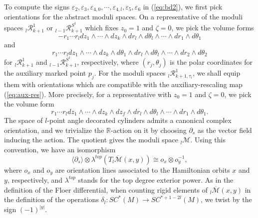 \documentclass[a4paper]{article}
\numberwithin{equation}{section}
\begin{document}
To compute the signs $\varepsilon_2,\varepsilon_3,\varepsilon_{4,0},\cdots,\varepsilon_{4,l},\varepsilon_5,\varepsilon_6$ in (\ref{eq:bd2}), we first pick orientations for the abstract moduli spaces. On a representative of the moduli spaces ${}_l\mathcal{R}_{k+1}^1$ or ${}_{l-1}\mathcal{R}_{k+1}^{S^1}$ which fixes $z_0=1$ and $\zeta=0$, we pick the volume forms
\begin{equation}
-r_1\cdots r_ldz_1\wedge\cdots\wedge dz_k\wedge dr_l\wedge d\theta_l\wedge\cdots\wedge dr_1\wedge d\theta_1
\end{equation}
and
\begin{equation}
r_1\cdots r_ldz_1\wedge\cdots\wedge dz_k\wedge d\theta_1\wedge dr_l\wedge d\theta_l\wedge\cdots\wedge dr_2\wedge d\theta_2
\end{equation}
for ${}_l\mathcal{R}_{k+1}^1$ and ${}_{l-1}\mathcal{R}_{k+1}^{S^1}$, respectively, where $(r_j,\theta_j)$ is the polar coordinates for the auxiliary marked point $p_j$. For the moduli spaces ${}_l\mathcal{R}_{k+1,\tau_i}^1$, we shall equip them with orientations which are compatible with the auxiliary-rescaling map (\ref{eq:aux-res}). More precisely, for a representative with $z_0=1$ and $\zeta=0$, we pick the volume form
\begin{equation}
r_1\cdots r_ldz_1\wedge\cdots\wedge dz_k\wedge dz_f\wedge dr_l\wedge d\theta_l\wedge\cdots\wedge dr_1\wedge d\theta_1.
\end{equation}
The space of $l$-point angle decorated cylinders admits a canonical complex orientation, and we trivialize the $\mathbb{R}$-action on it by choosing $\partial_s$ as the vector field inducing the action. The quotient gives the moduli space ${}_l\mathcal{M}$. Using this convention, we have an isomorphism
\begin{equation}\label{eq:M}
\langle\partial_s\rangle\otimes\lambda^\mathit{top}\left(T{}_l\overline{\mathcal{M}}(x,y)\right)\cong o_x\otimes o_y^{-1},
\end{equation}
where $o_x$ and $o_y$ are orientation lines associated to the Hamiltonian orbits $x$ and $y$, respectively, and $\lambda^\mathit{top}$ stands for the top degree exterior power. As in the definition of the Floer differential, when counting rigid elements of ${}_l\overline{\mathcal{M}}(x,y)$ in the definition of the operations $\delta_l:\mathit{SC}^\ast(M)\rightarrow\mathit{SC}^{\ast+1-2l}(M)$, we twist by the sign $(-1)^{|y|}$.
\end{document}
